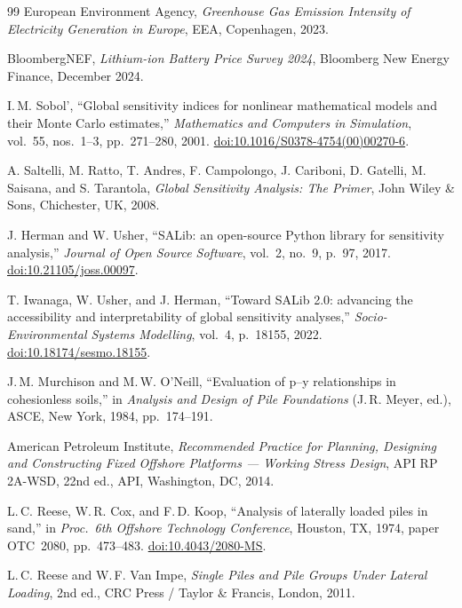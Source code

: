\documentclass[11pt,a4paper]{article}
\begin{document}
\begin{thebibliography}{99}
European Environment Agency,
\emph{Greenhouse Gas Emission Intensity of Electricity Generation in Europe},
EEA, Copenhagen, 2023.

BloombergNEF,
\emph{Lithium-ion Battery Price Survey 2024},
Bloomberg New Energy Finance, December 2024.

I.\,M. Sobol',
``Global sensitivity indices for nonlinear mathematical models and their Monte Carlo estimates,''
\emph{Mathematics and Computers in Simulation}, vol.~55, nos.~1--3, pp.~271--280, 2001.
\href{https://doi.org/10.1016/S0378-4754(00)00270-6}{doi:10.1016/S0378-4754(00)00270-6}.

A. Saltelli, M. Ratto, T. Andres, F. Campolongo, J. Cariboni, D. Gatelli, M. Saisana, and S. Tarantola,
\emph{Global Sensitivity Analysis: The Primer},
John Wiley \& Sons, Chichester, UK, 2008.

J. Herman and W. Usher,
``SALib: an open-source Python library for sensitivity analysis,''
\emph{Journal of Open Source Software}, vol.~2, no.~9, p.~97, 2017.
\href{https://doi.org/10.21105/joss.00097}{doi:10.21105/joss.00097}.

T. Iwanaga, W. Usher, and J. Herman,
``Toward SALib 2.0: advancing the accessibility and interpretability of global sensitivity analyses,''
\emph{Socio-Environmental Systems Modelling}, vol.~4, p.~18155, 2022.
\href{https://doi.org/10.18174/sesmo.18155}{doi:10.18174/sesmo.18155}.

J.\,M. Murchison and M.\,W. O'Neill,
``Evaluation of p--y relationships in cohesionless soils,''
in \emph{Analysis and Design of Pile Foundations} (J.\,R. Meyer, ed.),
ASCE, New York, 1984, pp.~174--191.

American Petroleum Institute,
\emph{Recommended Practice for Planning, Designing and Constructing Fixed Offshore Platforms --- Working Stress Design}, API RP 2A-WSD, 22nd ed.,
API, Washington, DC, 2014.

L.\,C. Reese, W.\,R. Cox, and F.\,D. Koop,
``Analysis of laterally loaded piles in sand,''
in \emph{Proc.\ 6th Offshore Technology Conference}, Houston, TX, 1974, paper OTC~2080, pp.~473--483.
\href{https://doi.org/10.4043/2080-MS}{doi:10.4043/2080-MS}.

L.\,C. Reese and W.\,F. Van Impe,
\emph{Single Piles and Pile Groups Under Lateral Loading}, 2nd ed.,
CRC Press / Taylor \& Francis, London, 2011.


\end{thebibliography}
\end{document}
